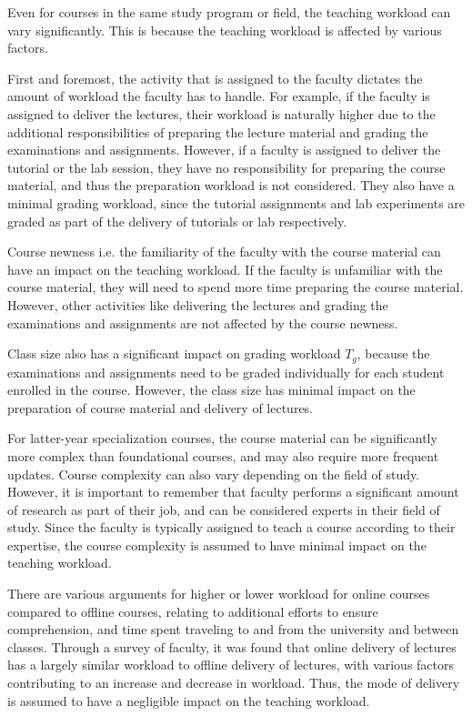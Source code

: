Even for courses in the same study program or field, the teaching workload can vary significantly. This is because the teaching workload is affected by various factors.

First and foremost, the activity that is assigned to the faculty dictates the amount of workload the faculty has to handle. For example, if the faculty is assigned to deliver the lectures, their workload is naturally higher due to the additional responsibilities of preparing the lecture material and grading the examinations and assignments. However, if a faculty is assigned to deliver the tutorial or the lab session, they have no responsibility for preparing the course material, and thus the preparation workload is not considered. They also have a minimal grading workload, since the tutorial assignments and lab experiments are graded as part of the delivery of tutorials or lab respectively.

Course newness i.e. the familiarity of the faculty with the course material can have an impact on the teaching workload. If the faculty is unfamiliar with the course material, they will need to spend more time preparing the course material. However, other activities like delivering the lectures and grading the examinations and assignments are not affected by the course newness.

Class size also has a significant impact on grading workload \( T_g \), because the examinations and assignments need to be graded individually for each student enrolled in the course. However, the class size has minimal impact on the preparation of course material and delivery of lectures.

For latter-year specialization courses, the course material can be significantly more complex than foundational courses, and may also require more frequent updates. Course complexity can also vary depending on the field of study. However, it is important to remember that faculty performs a significant amount of research as part of their job, and can be considered experts in their field of study. Since the faculty is typically assigned to teach a course according to their expertise, the course complexity is assumed to have minimal impact on the teaching workload.

There are various arguments for higher or lower workload for online courses compared to offline courses, relating to additional efforts to ensure comprehension, and time spent traveling to and from the university and between classes. Through a survey of faculty, it was found that online delivery of lectures has a largely similar workload to offline delivery of lectures, with various factors contributing to an increase and decrease in workload. Thus, the mode of delivery is assumed to have a negligible impact on the teaching workload.

